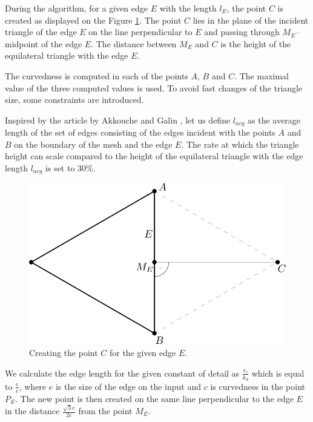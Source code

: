 During the algorithm, for a given edge $E$ with the length $l_E$, the point
$C$ is created as displayed on the Figure \ref{img:57}. The point $C$ lies
in the plane of the incident triangle of the edge $E$ on the line perpendicular
to $E$ and passing through $M_E$--midpoint of the edge $E$. The distance between
$M_E$ and $C$ is the height of the equilateral triangle with the edge $E$.

The curvedness is computed in each of the points $A$, $B$ and $C$.
The maximal value of the three computed values is used.
To avoid fast changes of the triangle size, some constraints are 
introduced. 

Inspired by the article by Akkouche and Galin \cite{akkouche2001adaptive},
let us define $l_{avg}$ as the average length of the set of edges consisting
of the edges incident with the points $A$ and $B$ on the boundary of the mesh
and the edge $E$.
The rate at which the triangle height can scale compared to
the height of the equilateral triangle with the edge length $l_{avg}$ is set to 30\%. 

\begin{figure}
    \centerline{\includegraphics[scale=0.5]{images/img57}}
    \caption[Creating the point $C$]
    {Creating the point $C$ for the given edge $E$.}
    \label{img:57}
\end{figure}

We calculate the edge length for the given constant of detail as $\frac{r_c}{k_d}$
which is equal to $\frac{e}{c}$, where $e$ is the size of the edge on the input 
and $c$ is curvedness in the point $P_E$. The new point is then created on the same
line perpendicular to the edge $E$ in the distance $\frac{\sqrt{3}e}{2c}$ from the point
$M_E$.

